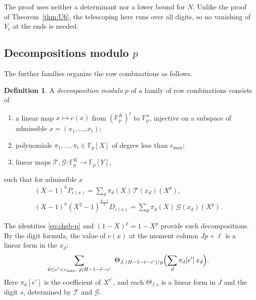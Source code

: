 \documentclass[11pt]{amsart}
\theoremstyle{definition}
\newtheorem{definition}[theorem]{Definition}
\theoremstyle{remark}
\numberwithin{equation}{section}
\newcommand{\F}{\mathbb F}
\begin{document}
The proof uses neither a determinant nor a lower bound for $N$. Unlike the proof of Theorem~\ref{thm:U6}, the
telescoping here runs over all digits, so no vanishing of $Y_c$ at the ends is needed.

\subsection{Decompositions modulo $p$}
The further families organize the row combinations as follows.

\begin{definition}\label{def:slot}
A \emph{decomposition modulo $p$} of a family of row combinations consists of
\begin{enumerate}[label=(\alph*)]
\item a linear map $x\mapsto c(x)$ from $(\F_p^K)^t$ to $\F_p^n$, injective on a subspace of admissible
 $x=(x_1,\dots,x_t)$;
\item polynomials $\pi_1,\dots,\pi_t\in\F_p[X]$ of degree less than $e_{\max}$;
\item linear maps $\mathcal T,\mathcal G\colon\F_p^K\to\F_p[Y]$,
\end{enumerate}
such that for admissible $x$
\begin{gather*}
 (X-1)^hP_{c(x)}=\sum_d\pi_d(X)\,\mathcal T(x_d)(X^p),\\
 (X-1)^h(X^2-1)^{\frac{p-1}2}D_{c(x)}=\sum_d\pi_d(X)\,\mathcal G(x_d)(X^p).
\end{gather*}
\end{definition}

The identities \eqref{eq:cheb-p} and $(1-X)^p=1-X^p$ provide such decompositions. By the digit formula, the
value of $c(x)$ at the moment column $Jp+\ell$ is a linear form in the $x_d$:
\[
 \sum_{0\le e'<e_{\max},\ p\mid H-1-\ell-e'}\ \Theta_{J,\,(H-1-\ell-e')/p}\Bigl(\sum_d\pi_d[e']\,x_d\Bigr).
\]
Here $\pi_d[e']$ is the coefficient of $X^{e'}$, and each $\Theta_{J,s}$ is a linear form in $J$ and the digit
$s$, determined by $\mathcal T$ and $\mathcal G$.
\end{document}
